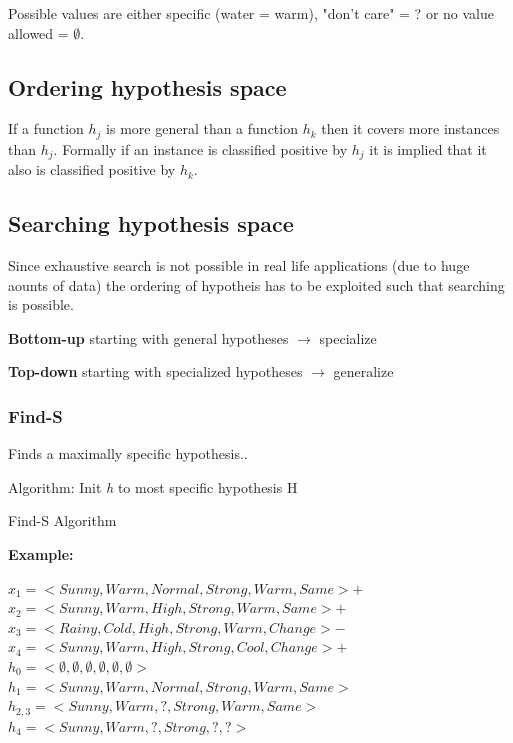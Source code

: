 \documentclass[fleqn, oneside, 10pt, titlepage]{article}
\newenvironment{shadedSmallerPadding}{
  \def\FrameCommand{\fboxsep=0.3cm \colorbox{MyBoxColor}}
  \MakeFramed {\advance\hsize-1.1\width\FrameRestore}}
{\endMakeFramed}
\begin{document}
Possible values are either specific (water = warm), "don't care" = ? or no value allowed = $\emptyset$.

\subsection{Ordering hypothesis space}
If a function $h_j$ is more general than a function $h_k$ then it covers more instances than $h_j$. Formally if an instance is classified positive by $h_j$ it is implied that it also is classified positive by $h_k$.

\subsection{Searching hypothesis space}
Since exhaustive search is not possible in real life applications (due to huge aounts of data) the ordering of hypotheis has to be exploited such that searching is possible.

\textbf{Bottom-up} starting with general hypotheses $\rightarrow$ specialize

\textbf{Top-down} starting with specialized hypotheses $\rightarrow$ generalize

\subsubsection{Find-S}
Finds a maximally specific hypothesis..

Algorithm: Init \textit{h} to most specific hypothesis H

\begin{shadedSmallerPadding}
\begin{algorithm}[H]
	\caption{Find-S Algorithm}
	\SetAlgoLined
			
		
\end{algorithm}

\textbf{Example:}

$x_1 = <Sunny,Warm,Normal,Strong,Warm,Same> +$\\
$x_2 = <Sunny,Warm,High,Strong,Warm,Same> +$ \\
$x_3 = <Rainy,Cold,High,Strong,Warm,Change> -$ \\
$x_4 = <Sunny,Warm,High,Strong,Cool,Change> +$\\
$h_0 = <\emptyset,\emptyset,\emptyset,\emptyset,\emptyset,\emptyset>$\\
$h_1 = <Sunny,Warm,Normal,Strong,Warm,Same>$\\
$h_{2,3} = <Sunny,Warm,?,Strong,Warm,Same>$\\
$h_4 = <Sunny,Warm,?,Strong,?,?>$
\end{shadedSmallerPadding}
\end{document}
